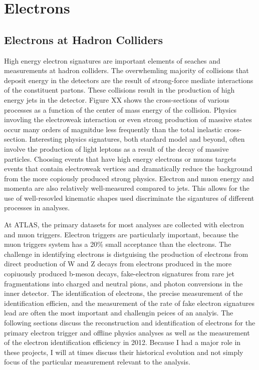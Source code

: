 \chapter[Electrons][Electrons]{Electrons}



\section{Electrons at Hadron Colliders}

High energy electron signatures are important elements of seaches and measurements at hadron colliders. The overwhemling majority of collisions that deposit energy in the detectors are the result of strong-force mediate interactions of the constituent partons. These collisions result in the production of high energy jets in the detector. Figure XX shows the cross-sections of various processes as a function of the center of mass energy of the collision. Physics invovling the electroweak interaction or even strong production of massive states occur many orders of magnitdue less frequently than the total inelastic cross-section. 
Interesting physics signatures, both stardard model and beyond, often involve the production of light leptons as a result of the decay of massive particles. Choosing events that have high energy electrons or muons targets events that contain electroweak vertices and dramatically reduce the background from the more copiously produced strong physics. Electron and muon energy and momenta are also relatively well-measured compared to jets. This allows for the use of well-resovled kinematic shapes used discriminate the sigantures of different processes in analyses. 

At ATLAS, the primary datasets for most analyses are collected with electron and muon triggers. Electron triggers are particularly important, because the muon triggers system has a 20\% small acceptance than the electrons. The challenge in identifying electrons is distguising the production of electrons from direct production of W and Z decays from electrons produced in the more copiuously produced b-meson decays, fake-electron signatures from rare jet fragmentations into charged and neutral pions, and photon conversions in the inner detector. The identification of electrons, the precise measurement of the identification efficien, and the measurement of the rate of fake electron signatures lead are often the most important and challengin peices of an analyis. The following sections discuss the reconstruction and identification of electrons for the primary electron trigger and offline physics analyses as well as the measurement of the electron identification efficiency in 2012. Because I had a major role in these projects, I will at times discuss their historical evolution and not simply focus of the particular measurement relevant to the \tth analysis.  



